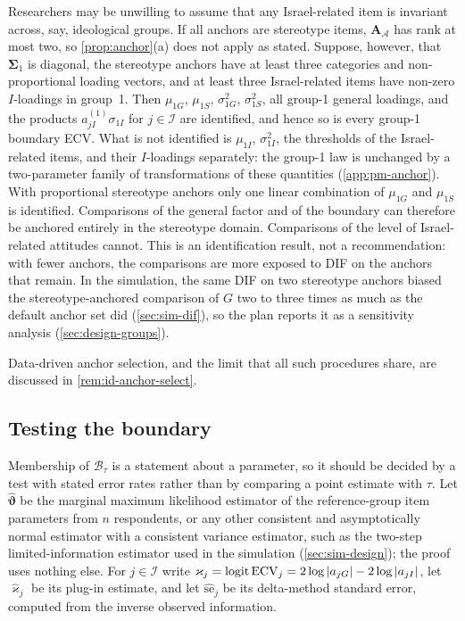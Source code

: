 \begin{remark}\label{rem:id-anchor-S}
Researchers may be unwilling to assume that any Israel-related item is invariant across, say, ideological groups. If all anchors are stereotype items, $\bm A_{\mathcal A}$ has rank at most two, so \cref{prop:anchor}(a) does not apply as stated. Suppose, however, that $\bm\Sigma_1$ is diagonal, the stereotype anchors have at least three categories and non-proportional loading vectors, and at least three Israel-related items have non-zero $I$-loadings in group~1. Then $\mu_{1G}$, $\mu_{1S}$, $\sigma^2_{1G}$, $\sigma^2_{1S}$, all group-1 general loadings, and the products $a^{(1)}_{jI}\sigma_{1I}$ for $j\in\mathcal I$ are identified, and hence so is every group-1 boundary ECV. What is not identified is $\mu_{1I}$, $\sigma^2_{1I}$, the thresholds of the Israel-related items, and their $I$-loadings separately: the group-1 law is unchanged by a two-parameter family of transformations of these quantities (\cref{app:pm-anchor}). With proportional stereotype anchors only one linear combination of $\mu_{1G}$ and $\mu_{1S}$ is identified. Comparisons of the general factor and of the boundary can therefore be anchored entirely in the stereotype domain. Comparisons of the level of Israel-related attitudes cannot. This is an identification result, not a recommendation: with fewer anchors, the comparisons are more exposed to DIF on the anchors that remain. In the simulation, the same DIF on two stereotype anchors biased the stereotype-anchored comparison of $G$ two to three times as much as the default anchor set did (\cref{sec:sim-dif}), so the plan reports it as a sensitivity analysis (\cref{sec:design-groups}).
\end{remark}


Data-driven anchor selection, and the limit that all such procedures share, are discussed in \cref{rem:id-anchor-select}.

\subsection{Testing the boundary}\label{sec:id-test}

Membership of $\mathcal B_\tau$ is a statement about a parameter, so it should be decided by a test with stated error rates rather than by comparing a point estimate with $\tau$. Let $\widehat{\bm\vartheta}$ be the marginal maximum likelihood estimator of the reference-group item parameters from $n$ respondents, or any other consistent and asymptotically normal estimator with a consistent variance estimator, such as the two-step limited-information estimator used in the simulation (\cref{sec:sim-design}); the proof uses nothing else. For $j\in\mathcal I$ write $\varkappa_j=\operatorname{logit}\mathrm{ECV}_j=2\log|a_{jG}|-2\log|a_{jI}|$, let $\widehat\varkappa_j$ be its plug-in estimate, and let $\widehat{\mathrm{se}}_j$ be its delta-method standard error, computed from the inverse observed information.

